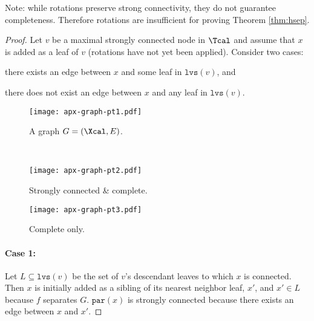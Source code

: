 \documentclass{article} \usepackage[utf8]{inputenc} \usepackage[T1]{fontenc}    \usepackage{hyperref}       \usepackage{url}            \usepackage{booktabs}       \usepackage{amsfonts}       \usepackage{nicefrac}       \usepackage{microtype}      \usepackage{geometry}
\newcommand{\lvs}[1]{\ensuremath{\texttt{lvs}(#1)}}
\newcommand{\parent}[1]{\ensuremath{\texttt{par}}(#1)\xspace}
\begin{document}
\begin{appendix}
Note: while rotations preserve strong connectivity, they do not
guarantee completeness. Therefore rotations are insufficient for
proving Theorem \ref{thm:hsep}.

\begin{proof}
Let $v$ be a maximal strongly connected node in $\Tcal$ and assume
that $x$ is added as a leaf of $v$ (rotations have not yet been
applied). Consider two cases:
\begin{enumerate*}[label=(\arabic*)]
\item there exists an edge between $x$ and some leaf in $\lvs{v}$,
  and
\item there does not exist an edge between $x$ and any leaf in
  $\lvs{v}$.
\end{enumerate*}

\begin{figure*}[t!]
  \captionsetup[subfigure]{justification=centering}
  \centering
  \begin{subfigure}[h]{0.5\textwidth}
  \centerline{\texttt{[image: apx-graph-pt1.pdf]}}
  \caption{A graph $G = (\Xcal, E)$.}
    \label{fig:grinch-graph}
\end{subfigure}\\
\begin{subfigure}[h]{0.49\textwidth}
  \centerline{\texttt{[image: apx-graph-pt2.pdf]}}
  \caption{Strongly connected \& complete.}
    \label{fig:strong-complete}
\end{subfigure}
\begin{subfigure}[h]{0.49\textwidth}
  \centerline{\texttt{[image: apx-graph-pt3.pdf]}}
  \caption{Complete only.}
    \label{fig:complete-only}
\end{subfigure}
\caption{A graph $G$ with 3 connected components (Figure
  \ref{fig:grinch-graph}).  In Figure \ref{fig:strong-complete} and
  Figure \ref{fig:complete-only}, black-filled nodes are maximal,
  gray-filled nodes are strongly connected, nodes with no fill and
  solid borders are connected (but not strongly), and nodes with dashed
  borders are disconnected. The tree in Figure
  \ref{fig:strong-complete} satisfies strong connectivity and
  completeness. The tree in Figure \ref{fig:complete-only} does not
  satisfy strong connectivity because $v_1$ is disconnected.}
\label{fig:graph-strong-complete}
\end{figure*}
 
\paragraph{Case 1:}
Let $L \subseteq \lvs{v}$ be the set of $v$'s descendant leaves to
which $x$ is connected. Then $x$ is initially added as a sibling of
its nearest neighbor leaf, $x'$, and $x' \in L$ because $f$ separates
$G$. $\parent{x}$ is strongly connected because there exists an edge
between $x$ and $x'$.


\end{proof}
\end{appendix}
\end{document}
